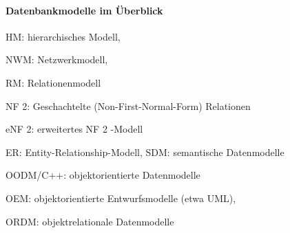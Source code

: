 \documentclass[a4paper]{article}
\begin{document}
\begin{multicols}{3}
    \paragraph{Datenbankmodelle im Überblick}
    \begin{itemize*}
        \item HM: hierarchisches Modell,
        \item NWM: Netzwerkmodell,
        \item RM: Relationenmodell
        \item NF 2: Geschachtelte (Non-First-Normal-Form) Relationen
        \item eNF 2: erweitertes NF 2 -Modell
        \item ER: Entity-Relationship-Modell, SDM: semantische Datenmodelle
        \item OODM/C++: objektorientierte Datenmodelle
        \begin{itemize*}
            \item OEM: objektorientierte Entwurfsmodelle (etwa UML),
            \item ORDM: objektrelationale Datenmodelle
        \end{itemize*}
    \end{itemize*}


\end{multicols}
\end{document}
